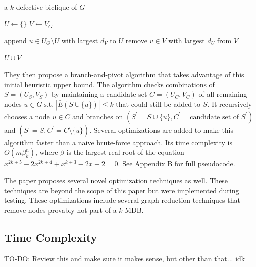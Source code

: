 \documentclass{article}
\begin{document}
\
\begin{algorithm}[H]
\caption{$\theta$-Heuristic}
\begin{minipage}{\textwidth}
\begin{algorithmic}

    \Ensure a $k$-defective biclique of $G$

        \State $U\gets \{\}$
        \State $V \gets V_G$

            \State append $u \in U_G \setminus U$ with largest $d_V$ to $U$
            \While{$|\bar{E}(U \cup V)| > k$}
                \State remove $v \in V$ with largest $\bar{d}_U$ from $V$
            \EndWhile
        \EndWhile

        \State \Return $U \cup V$
    \EndFunction
    
\end{algorithmic}
\end{minipage}
\end{algorithm}

They then propose a branch-and-pivot algorithm that takes advantage of this initial heuristic upper bound. The algorithm checks combinations of $S = (U_S, V_S)$ by maintaining a candidate set $C = (U_C, V_C)$ of all remaining nodes $u \in G \mathrel{\text{s.t.}} |\bar{E}(S \cup \{u\})| \leq k$ that could still be added to $S$. It recursively chooses a node $u \in C$ and branches on $(S^\prime = S \cup \{u\}, C^\prime = \text{candidate set of } S^\prime)$ and $(S^\prime = S, C^\prime = C \setminus \{u\})$. Several optimizations are added to make this algorithm faster than a naive brute-force approach. Its time complexity is $O(m\beta_k^n)$, where $\beta$ is the largest real root of the equation $x^{2k + 5} - 2x^{2k + 4} +  x^{k + 3} - 2x + 2 = 0$. See Appendix B for full pseudocode. 

The paper proposes several novel optimization techniques as well. These techniques are beyond the scope of this paper but were implemented during testing. These optimizations include several graph reduction techniques that remove nodes provably not part of a $k$-MDB.


\subsection{Time Complexity}

TO-DO: Review this and make sure it makes sense, but other than that... idk
\end{document}
